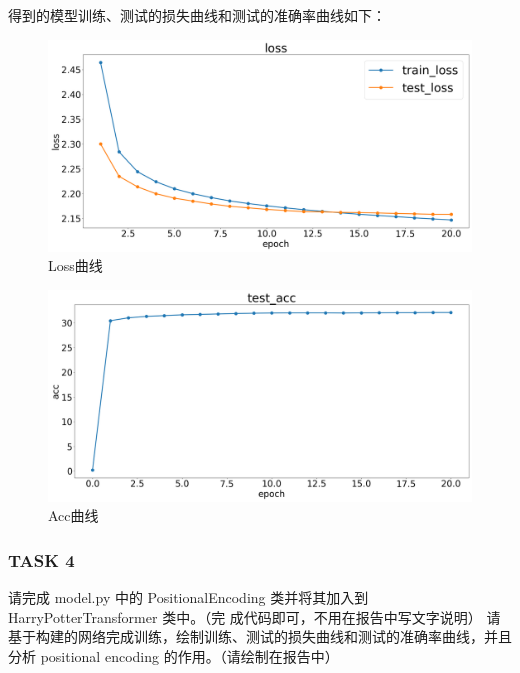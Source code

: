 \documentclass{article}%
\begin{document}
得到的模型训练、测试的损失曲线和测试的准确率曲线如下：
\begin{figure}[H]
    \centering
    \includegraphics[width=0.9\linewidth]{../exp_task3/figs/loss.png}
    \caption{Loss曲线}
\end{figure}
\begin{figure}[H]
    \centering
    \includegraphics[width=0.9\linewidth]{../exp_task3/figs/test_acc.png}
    \caption{Acc曲线}
\end{figure}

\subsubsection{TASK 4}
请完成 model.py 中的 PositionalEncoding 类并将其加入到 HarryPotterTransformer 类中。（完
成代码即可，不用在报告中写文字说明）
请基于构建的网络完成训练，绘制训练、测试的损失曲线和测试的准确率曲线，并且分析 positional
encoding 的作用。（请绘制在报告中）
\end{document}
